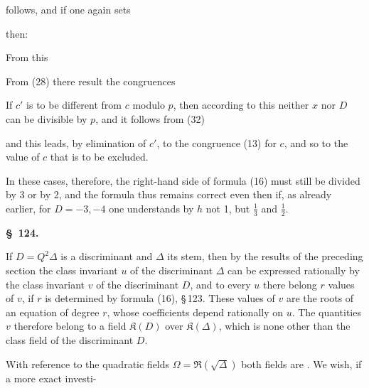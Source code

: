 follows, and if one again sets


then:


From this


From (28) there result the congruences


If $c'$ is to be different from $c$ modulo $p$, then according to this neither $x$ nor $D$ can be divisible by $p$, and it follows from (32)


and this leads, by elimination of $c'$, to the congruence (13) for $c$, and so to the value of $c$ that is to be excluded.


In these cases, therefore, the right-hand side of formula (16) must still be divided by 3 or by 2, and the formula thus remains correct even then if, as already earlier, for $D=-3, -4$ one understands by $h$ not 1, but $\frac{1}{3}$ and $\frac{1}{2}$.

\begin{center}
\textbf{\S\ 124. }
\end{center}

If $D=Q^2\Delta$ is a discriminant and $\Delta$ its stem, then by the results of the preceding section the class invariant $u$ of the discriminant $\Delta$ can be expressed rationally by the class invariant $v$ of the discriminant $D$, and to every $u$ there belong $r$ values of $v$, if $r$ is determined by formula (16), \S\,123. These values of $v$ are the roots of an equation of degree $r$, whose coefficients depend rationally on $u$. The quantities $v$ therefore belong to a field $\mathfrak{K}(D)$ over $\mathfrak{K}(\Delta)$, which is none other than the class field of the discriminant $D$.

With reference to the quadratic fields $\Omega=\mathfrak{R}(\sqrt{\Delta})$ both fields are . We wish, if a more exact investi-
